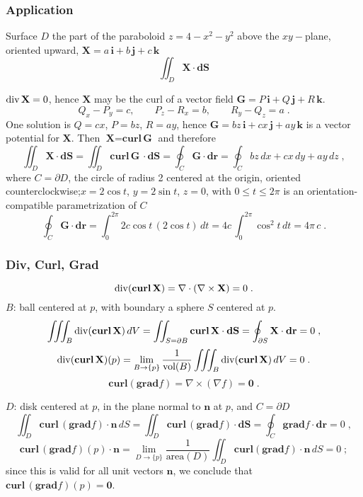 \begin{frame}
  \frametitle{Application}
Surface $D$ the part of the paraboloid $z=4-x^2-y^2$ above the $xy-$plane, oriented upward, $\textbf{X} = a\, \textbf{i} +b\, \textbf{j} +c\, \textbf{k}$
%
$$\iint_D \textbf{X} \cdot \textbf{dS} $$
%

\pause
$\operatorname{div} \textbf{X} =0$, hence $\textbf{X}$ may be the curl of a vector field $\textbf{G}=P\, \textbf{i} + Q\, \textbf{j} + R\, \textbf{k}$.\pause
%
$$Q_x - P_y = c, \qquad P_z-R_x = b, \qquad R_y-Q_z= a\; .$$
%
\pause One solution is $Q=cx$, $P=bz$, $R=ay$, hence $\textbf{G} = bz\, \textbf{i} + cx\, \textbf{j} + ay\, \textbf{k}$ is a vector potential for $\textbf{X}$. Then $\textbf{X}= \textbf{curl}\, \textbf{G}$ and therefore
%
$$\iint_D \textbf{X} \cdot \textbf{dS} = \iint_D \textbf{curl}\, \textbf{G}\, \cdot \textbf{dS} = \oint_C \textbf{G} \cdot \textbf{dr} = \oint_C bz\, dx + cx\, dy + ay\, dz\; ,$$
%
where $C =\partial D$, the circle of radius 2 centered at the origin, oriented counterclockwise;\pause $x=2\cos{t}$, $y=2\sin{t}$, $z=0$, with $0 \leqslant t \leqslant 2\pi$ is an orientation-compatible parametrization of $C$
%
$$\oint_{C} \textbf{G} \cdot \textbf{dr} = \int_{0}^{2\pi} 2c\cos{t} \, (2\cos{t}) \, dt = 4c\, \int_{0}^{2\pi} \cos^2{t} \, dt = 4\pi\,c \; .$$
\end{frame}

\begin{frame}
  \frametitle{Div, Curl, Grad}

$$\operatorname{div} (\textbf{curl} \, \textbf{X})  = \nabla \cdot (\nabla \times \textbf{X}) = 0 \; .$$
%
\pause $B$: ball centered at $p$, with boundary a sphere $S$ centered at $p$.
%
$$\iiint_B \operatorname{div} (\textbf{curl}\,\textbf{X}) \, dV = \iint_{S=\partial B} \textbf{curl}\, \textbf{X} \cdot \textbf{dS} = \oint_{\partial S} \textbf{X} \cdot \textbf{dr} = 0\; ,$$
%
$$\operatorname{div} (\textbf{curl}\, \textbf{X}) (p) = \lim_{B \to \{p\}} \frac{1}{\text{vol}(B)} \iiint_B \operatorname{div} (\textbf{curl}\, \textbf{X}) \, dV = 0\; .$$
\pause
%
$$\textbf{curl} ( \textbf{grad} f ) = \nabla \times (\nabla f) = \textbf{0}\; .$$

\pause $D$: disk centered at $p$, in the plane normal to $\textbf{n}$ at $p$, and $C=\partial D$
%
$$\iint_D \textbf{curl} \,(\textbf{grad} f) \cdot \textbf{n}\, dS = \iint_D \textbf{curl}\, (\textbf{grad} f) \cdot \textbf{dS} = \oint_C \textbf{grad} f \cdot \textbf{dr} = 0\; ,$$
%
$$\textbf{curl} \,(\textbf{grad} f) (p) \cdot \textbf{n} = \lim_{D\to \{p\}} \frac{1}{\text{area}(D)} \iint_D \textbf{curl} (\textbf{grad} f) \cdot \textbf{n}\, dS = 0\; ; $$
%
since this is valid for all unit vectors $\textbf{n}$, we conclude that $\textbf{curl} \,(\textbf{grad} f) (p)= \textbf{0}$.
\end{frame}

